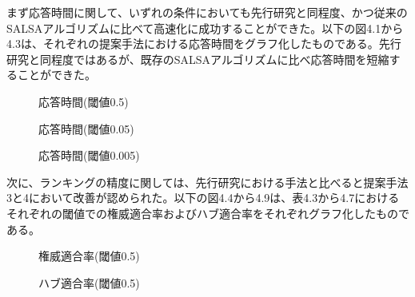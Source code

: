 \documentclass[a4paper,11pt]{jreport}
\begin{document}
\clearpage

まず応答時間に関して、いずれの条件においても先行研究と同程度、かつ従来のSALSAアルゴリズムに比べて高速化に成功することができた。以下の図4.1から4.3は、それぞれの提案手法における応答時間をグラフ化したものである。先行研究と同程度ではあるが、既存のSALSAアルゴリズムに比べ応答時間を短縮することができた。

\begin{figure}[htbp]
\begin{center}
\end{center}
\caption{応答時間(閾値0.5)}
\label{figure:sample}
\end{figure}

\begin{figure}[htbp]
\begin{center}
\end{center}
\caption{応答時間(閾値0.05)}
\label{figure:sample}
\end{figure}

\begin{figure}[htbp]
\begin{center}
\end{center}
\caption{応答時間(閾値0.005)}
\label{figure:sample}
\end{figure}

\clearpage

次に、ランキングの精度に関しては、先行研究における手法と比べると提案手法3と4において改善が認められた。以下の図4.4から4.9は、表4.3から4.7におけるそれぞれの閾値での権威適合率およびハブ適合率をそれぞれグラフ化したものである。

\begin{figure}[htbp]
\begin{center}
\end{center}
\caption{権威適合率(閾値0.5)}
\label{figure:sample}
\end{figure}

\begin{figure}[htbp]
\begin{center}
\end{center}
\caption{ハブ適合率(閾値0.5)}
\label{figure:sample}
\end{figure}
\end{document}
